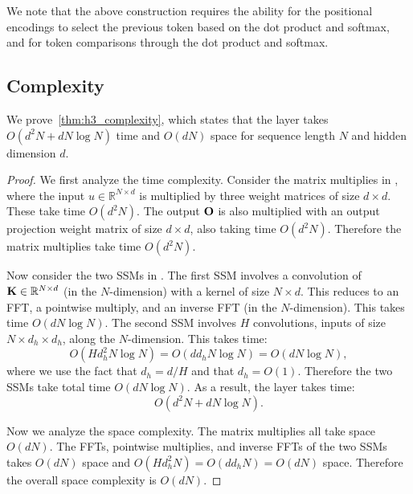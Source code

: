 We note that the above construction requires the ability for the positional encodings to select the previous token based on the dot product and softmax, and for token comparisons through the dot product and softmax.

\subsection{\hthree Complexity}
\label{sec:app_h3_complexity}

We prove~\cref{thm:h3_complexity}, which states that the \hthree layer takes
$O(d^2N + d N \log N)$ time and $O(dN)$ space for sequence length $N$ and hidden
dimension $d$.

\begin{proof}
  We first analyze the time complexity.
  Consider the matrix multiplies in \hthree, where the input $u \in \mathbb{R}^{N \times d}$ is
  multiplied by three weight matrices of size $d \times d$. These take time $O(d^2N)$.
  The output $\mathbf{O}$ is also multiplied with an output projection weight matrix of
  size $d \times d$, also taking time $O(d^2N)$.
  Therefore the matrix multiplies take time $O(d^2N)$.

  Now consider the two SSMs in \hthree. The first SSM involves a convolution of
  $\mathbf{K} \in \mathbb{R}^{N \times d}$ (in the $N$-dimension) with a kernel of size $N \times d$.
  This reduces to an FFT, a pointwise multiply, and an inverse FFT (in the
  $N$-dimension).
  This takes time $O(d N \log N)$.
  The second SSM involves $H$ convolutions, inputs of size $N \times d_h \times d_h$,
  along the $N$-dimension.
  This takes time:
  \begin{equation*}
    O(H d_h^2 N \log N) = O(d d_h N \log N) = O(d N \log N),
  \end{equation*}
  where we use the fact that $d_h = d / H$ and that $d_h = O(1)$.
  Therefore the two SSMs take total time $O(d N \log N)$.
  As a result, the \hthree layer takes time:
  \begin{equation*}
    O(d^2N + d N \log N).
  \end{equation*}

  Now we analyze the space complexity.
  The matrix multiplies all take space $O(dN)$.
  The FFTs, pointwise multiplies, and inverse FFTs of the two SSMs takes $O(dN)$
  space and $O(H d_h^2N) = O(dd_hN) = O(dN)$ space.
  Therefore the overall space complexity is $O(dN)$.

\end{proof}


